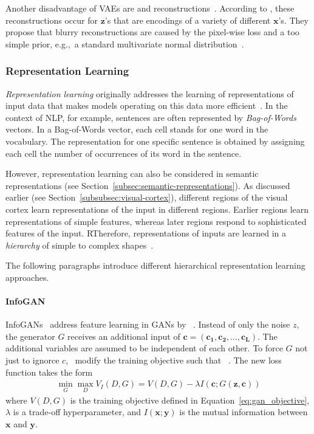 Another disadvantage of \acp{VAE} are  and  reconstructions~\citep{zhao2017towards}.
According to \citet{zhao2017towards}, these reconstructions occur for $\bm{z}$'s that are encodings of a variety of different $\bm{x}$'s.
They propose that blurry reconstructions are caused by the pixel-wise loss and a too simple prior, e.g.,~a standard multivariate normal distribution~\citep{zhao2017towards}.

\subsubsection{Representation Learning}\label{subsubsec:representation_learning}
\textit{Representation learning} originally addresses the learning of representations of input data that makes models operating on this data more efficient~\citep{bengio2013representation}.
In the context of \ac{NLP}, for example, sentences are often represented by \textit{Bag-of-Words} vectors.
In a Bag-of-Words vector, each cell stands for one word in the vocabulary.
The representation for one specific sentence is obtained by assigning each cell the number of occurrences of its word in the sentence.

However, representation learning can also be considered in semantic representations (see Section~\ref{subsec:semantic-representations}).
As discussed earlier (see Section~\ref{subsubsec:visual-cortex}), different regions of the visual cortex learn representations of the input in different regions.
Earlier regions learn representations of simple features, whereas later regions respond to sophisticated features of the input.
RTherefore, representations of inputs are learned in a \textit{hierarchy} of simple to complex shapes~\citep{rodriguez2015hierarchical}.

The following paragraphs introduce different hierarchical representation learning approaches.

\paragraph{InfoGAN}
InfoGANs~\cite{chen2016infogan} address feature learning in \acp{GAN} by ~\citep{chen2016infogan}.
Instead of only the noise $z$, the generator $G$ receives an additional input of  $\bm{c} = (\bm{c_1}, \bm{c_2}, \dots, \bm{c_L})$.
The additional variables are assumed to be independent of each other.
To force $G$ not just to ignorce $c$,~\citet{chen2016infogan} modify the training objective such that ~\citep{chen2016infogan}.
The new loss function takes the form
\begin{align}
    \min _{G} \max _{D} V_I(D, G)=V(D, G) - \lambda I(\bm{c}; G(\bm{z}, \bm{c}))
\end{align}
where $V(D, G)$ is the training objective defined in Equation~\ref{eq:gan_objective}, $\lambda$ is a trade-off hyperparameter, and $I(\bm{x}; \bm{y})$ is the mutual information between $\bm{x}$ and $\bm{y}$.

